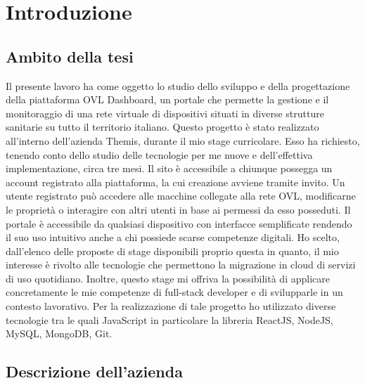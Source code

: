\chapter{Introduzione}
\label{chap:Introduzione}

\section{Ambito della tesi}
\label{sec:ambito della tesi}

Il presente lavoro ha come oggetto lo studio dello sviluppo e della progettazione della piattaforma OVL Dashboard, un portale che permette la gestione e il monitoraggio di una rete virtuale di dispositivi situati in diverse strutture sanitarie su tutto il territorio italiano. Questo progetto è stato realizzato all’interno dell’azienda Themis, durante il mio stage curricolare. Esso ha richiesto, tenendo conto dello studio delle tecnologie per me nuove e dell'effettiva implementazione, circa tre mesi.
Il sito è accessibile a chiunque possegga un account registrato alla piattaforma, la cui creazione avviene tramite invito. Un utente registrato può accedere alle macchine collegate alla rete OVL, modificarne le proprietà o interagire con altri utenti in base ai permessi da esso posseduti. Il portale è accessibile da qualsiasi dispositivo con interfacce semplificate  rendendo il suo uso intuitivo anche a chi possiede scarse competenze digitali.
\newline
Ho scelto, dall’elenco delle proposte di stage disponibili proprio questa in quanto, il mio interesse è rivolto alle tecnologie che permettono la migrazione in cloud di servizi di uso quotidiano. Inoltre, questo stage mi offriva la possibilità di applicare concretamente le mie competenze di full-stack developer e di svilupparle in un contesto lavorativo.
Per la realizzazione di tale progetto ho utilizzato diverse tecnologie tra le quali JavaScript in particolare la libreria ReactJS, NodeJS, MySQL, MongoDB, Git.

\section{Descrizione dell'azienda}
\label{sec:descrizione dell'azienda}

